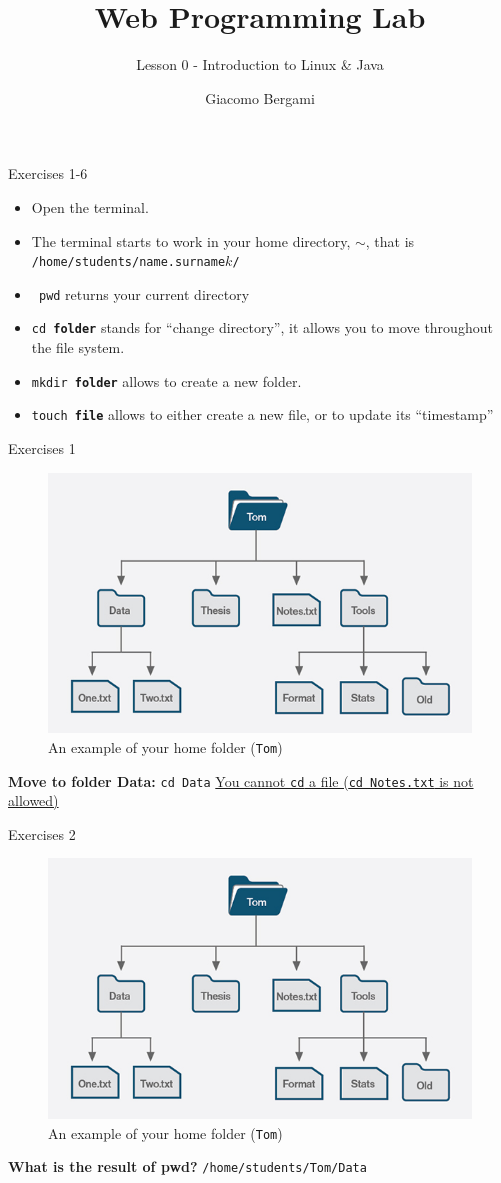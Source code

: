 \documentclass{beamer}
\title{Web Programming Lab}
\subtitle{Lesson 0 - Introduction to Linux \& Java}
\author{Giacomo Bergami}
\institute{University of Bologna}
\begin{document}
  \begin{frame}{Exercises 1-6}
    \begin{itemize}
    	\item Open the terminal. 
    	\item The terminal starts to work in your home directory, $\sim$, that is \texttt{/home/students/name.surname$k$/}
    	\item \texttt{\color{green} pwd} returns your current directory
    	\item \texttt{\color{green}cd \textbf{\color{red}folder}} stands for ``change directory'', it allows you to move throughout the file system.
    	\item \texttt{\color{green}mkdir \textbf{\color{red}folder}} allows to create a new folder.
    	\item \texttt{\color{green}touch \textbf{\color{red}file}} allows to either create a new file, or to update its ``timestamp''
    \end{itemize}
  \end{frame}

\begin{frame}{Exercises 1}
\begin{figure}
	\centering
	\includegraphics[width=0.7\linewidth]{00shell}
	\caption{An example of your home folder (\texttt{Tom})}
	\label{fig:00shell}
\end{figure}
\textbf{Move to folder Data:} \pause \texttt{cd Data}
\underline{You cannot \texttt{cd} a file (\texttt{cd Notes.txt} is not allowed)}
\end{frame}

\begin{frame}{Exercises 2}
	\begin{figure}
		\centering
		\includegraphics[width=0.7\linewidth]{00shell}
		\caption{An example of your home folder (\texttt{Tom})}
		\label{fig:00shell}
	\end{figure}
	\textbf{What is the result of pwd?} \pause \texttt{/home/students/Tom/Data}
\end{frame}
\end{document}
